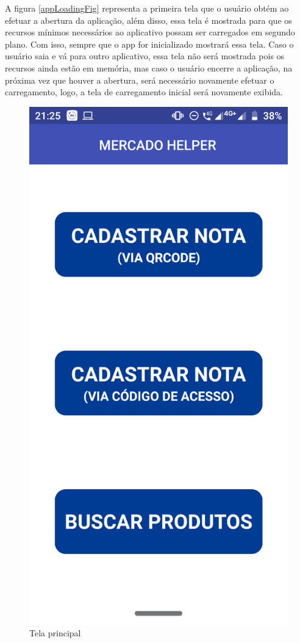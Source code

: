 A figura \ref{appLoadingFig} representa a primeira tela que o usuário obtém ao efetuar a abertura da aplicação, além disso, essa tela é mostrada para que os recursos mínimos necessários ao aplicativo possam ser carregados em segundo plano. Com isso, sempre que o app for inicializado mostrará essa tela. Caso o usuário saia e vá para outro aplicativo, essa tela não será mostrada pois os recursos ainda estão em memória, mas caso o usuário encerre a aplicação, na próxima vez que houver a abertura, será necessário novamente efetuar o carregamento, logo, a tela de carregamento inicial será novamente exibida.

\begin{figure}[h]
    \centering
    \includegraphics[scale=0.15]{tcc/figures/app/app_home.png}
    \caption{Tela principal}
    \label{appHomeFig}
\end{figure}

